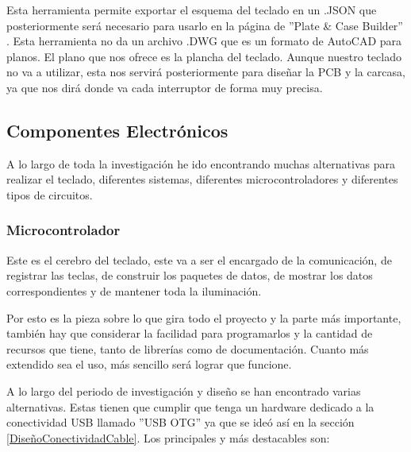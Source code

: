 Esta herramienta permite exportar el esquema del teclado en un .JSON que posteriormente será necesario para usarlo en la página de ''Plate \& Case Builder'' \cite{builder-swillkb}. Esta herramienta no da un archivo .DWG que es un formato de AutoCAD para planos. El plano que nos ofrece es la plancha del teclado. Aunque nuestro teclado no va a utilizar, esta nos servirá posteriormente para diseñar la \gls{PCB} y la carcasa, ya que nos dirá donde va cada interruptor de forma muy precisa.

\subsection{Componentes Electrónicos}
A lo largo de toda la investigación he ido encontrando muchas alternativas para realizar el teclado, diferentes sistemas, diferentes microcontroladores y diferentes tipos de circuitos.

\subsubsection{Microcontrolador}
Este es el cerebro del teclado, este va a ser el encargado de la comunicación, de registrar las teclas, de construir los paquetes de datos, de mostrar los datos correspondientes y de mantener toda la iluminación.

Por esto es la pieza sobre lo que gira todo el proyecto y la parte más importante, también hay que considerar la facilidad para programarlos y la cantidad de recursos que tiene, tanto de librerías como de documentación.
Cuanto más extendido sea el uso, más sencillo será lograr que funcione.

A lo largo del periodo de investigación y diseño se han encontrado varias alternativas. Estas tienen que cumplir que tenga un hardware dedicado a la conectividad \gls{USB} llamado ''\gls{USB} OTG'' ya que se ideó así en la sección \ref{DiseñoConectividadCable}. Los principales y más destacables son:

